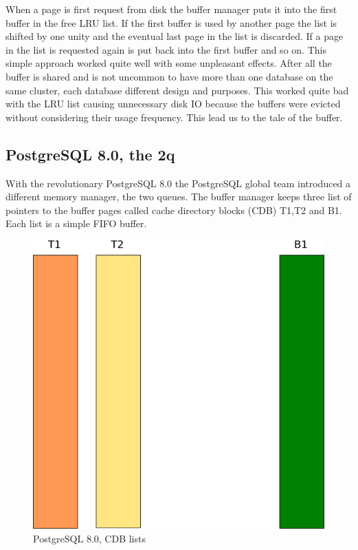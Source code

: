 When a page is first request from disk the buffer manager puts it into the first buffer in the free LRU 
list. If the first buffer is used by another page the list is shifted by one unity and the eventual last 
page in the list is discarded. If a page in the list is requested again is put back into the first buffer 
and so on. This simple approach worked quite well with some unpleasant effects. After all the buffer is 
shared and is not uncommon to have more than one database on the same cluster, each database different 
design and purposes. This worked quite bad with the LRU list causing unnecessary disk IO because the 
buffers were evicted without considering their usage frequency. This lead us to the tale of the buffer.


\subsection{PostgreSQL 8.0, the 2q}
With the revolutionary PostgreSQL 8.0 the PostgreSQL global team introduced a different memory manager, the two 
queues.\newline 
The buffer manager keeps three list of pointers to the buffer pages called cache directory blocks (CDB) T1,T2 and 
B1. Each list is a simple FIFO buffer.\newline

\begin{figure}[H]
\includegraphics[scale=0.6]{images/shared_buffer_80.png}

\caption{PostgreSQL 8.0, CDB lists}

\end{figure}

